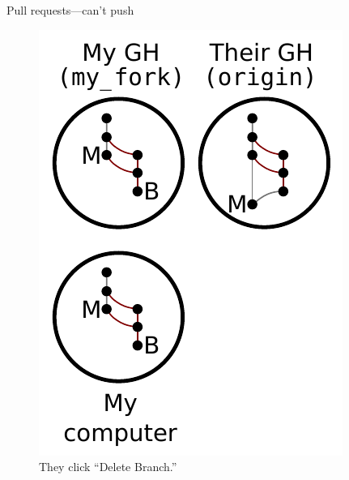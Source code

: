 \begin{frame}{Pull requests---can't push}
  \begin{figure}
    \includegraphics{fork_014.pdf}
    \\ They click ``Delete Branch.''
    \\ \texttt{}
  \end{figure}
\end{frame}

